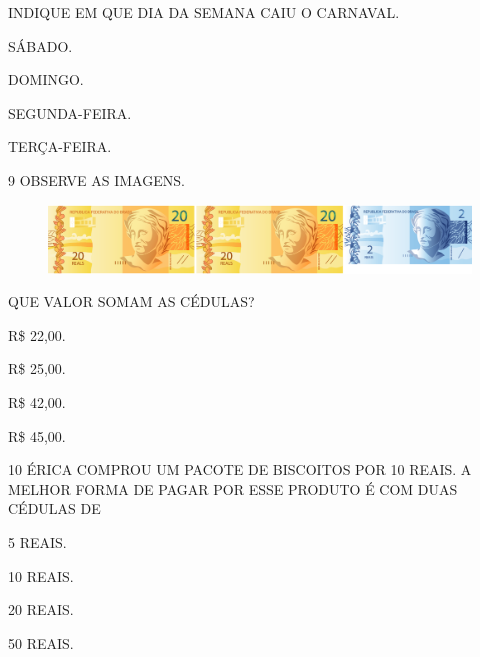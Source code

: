 INDIQUE EM QUE DIA DA SEMANA CAIU O CARNAVAL.

\begin{escolha}
\item SÁBADO.

\item DOMINGO.

\item SEGUNDA-FEIRA.

\item TERÇA-FEIRA.
\end{escolha}

\num{9} OBSERVE AS IMAGENS.


\begin{figure}[H]
\centering
\includegraphics[width=\textwidth]{./media/SAEB_1ANO_MAT_FIGURA117b.png}
\end{figure}

QUE VALOR SOMAM AS CÉDULAS?

\begin{escolha}
\item R\$ 22,00.

\item R\$ 25,00.

\item R\$ 42,00.

\item R\$ 45,00.
\end{escolha}

\pagebreak
\num{10} ÉRICA COMPROU UM PACOTE DE BISCOITOS POR 10 REAIS. A MELHOR
FORMA DE PAGAR POR ESSE PRODUTO É COM DUAS CÉDULAS DE

\begin{escolha}
\item 5 REAIS.

\item 10 REAIS.

\item 20 REAIS.

\item 50 REAIS.
\end{escolha}

